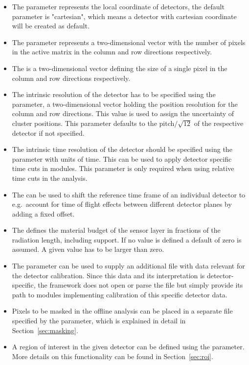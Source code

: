 \begin{itemize}
\item The  parameter represents the local coordinate of detectors, the default parameter is "cartesian", which means a detector with cartesian coordinate will be created as default.

\item The  parameter represents a two-dimensional vector with the number of pixels in the active matrix in the column and row directions respectively.
\item The  is a two-dimensional vector defining the size of a single pixel in the column and row directions respectively.
\item The intrinsic resolution of the detector has to be specified using the  parameter, a two-dimensional vector holding the position resolution for the column and row directions. This value is used to assign the uncertainty of cluster positions. This parameter defaults to the pitch$/\sqrt{12}$ of the respective detector if not specified.
\item The intrinsic time resolution of the detector should be specified using the  parameter with units of time. This can be used to apply detector specific time cuts in modules. This parameter is only required when using relative time cuts in the analysis.
\item The  can be used to shift the reference time frame of an individual detector to e.g.\ account for time of flight effects between different detector planes by adding a fixed offset.
\item The  defines the material budget of the sensor layer in fractions of the radiation length, including support. If no value is defined a default of zero is assumed. A given value has to be larger than zero.
\item The  parameter can be used to supply an additional file with data relevant for the detector calibration. Since this data and its interpretation is detector-specific, the framework does not open or parse the file but simply provide its path to modules implementing calibration of this specific detector data.
\item Pixels to be masked in the offline analysis can be placed in a separate file specified by the  parameter, which is explained in detail in Section~\ref{sec:masking}.
\item A region of interest in the given detector can be defined using the  parameter. More details on this functionality can be found in Section~\ref{sec:roi}.
\end{itemize}

